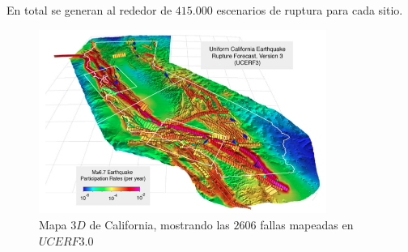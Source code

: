 \documentclass{beamer}
\begin{document}
\begin{frame}[allowframebreaks]
%
En total se generan al rededor de $415.000$ escenarios de ruptura para cada sitio. 
%
%
%
\begin{figure}[h]
	\centering
	\includegraphics[height=6cm]{img/UCERF3_Map.png}
	\caption{Mapa $3D$ de California, mostrando las $2606$ fallas mapeadas en $UCERF3.0$ \cite[figura 1, página 5]{ucerf3}}
\end{figure}
%
\end{frame}
%
%
\end{document}
